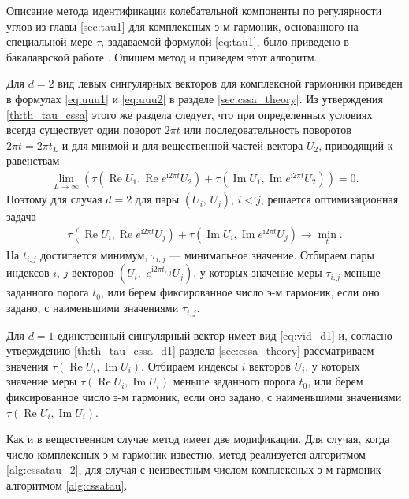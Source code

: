 \documentclass[specialist,
               substylefile = spbu.rtx,
               subf,href,colorlinks=true, 12pt]{disser}
\def\RE{\mathop{\mathrm{Re}}}
\def\IM{\mathop{\mathrm{Im}}}
\newcommand{\I}{\mathrm{i}}
\begin{document}
Описание метода идентификации колебательной компоненты по регулярности углов из главы \ref{sec:tau1} для комплексных э-м гармоник, основанного на специальной мере $\tau$, задаваемой формулой \eqref{eq:tau1}, было приведено в бакалаврской работе \cite{Zhornikova2016}. Опишем метод и приведем этот алгоритм.

Для $d=2$ вид левых сингулярных векторов для комплексной гармоники приведен в формулах \ref{eq:uuu1} и \eqref{eq:uuu2} в разделе \eqref{sec:cssa_theory}.
Из утверждения \ref{th:th_tau_cssa} этого же раздела следует, что при определенных условиях всегда существует один поворот $2\pi t$ или последовательность поворотов $2\pi t = 2\pi t_L$ и для мнимой и для вещественной частей вектора $U_2$, приводящий к равенствам
\begin{gather*}
\lim_{L \rightarrow \infty}(\tau (\RE U_1, \RE e^{\I 2\pi t} U_2) + \tau (\IM U_1, \IM e^{\I 2\pi t} U_2))= 0.
\end{gather*}
Поэтому для случая $d=2$ для пары $(U_i,\,U_j)$, $i<j$, решается оптимизационная задача
\begin{gather} \label{eq:cssa_tau_opt}
 \tau(\RE U_i, \RE e^{\I 2\pi t} U_j) + \tau(\IM U_i, \IM e^{\I 2\pi t} U_j) \longrightarrow \min_{t}.
\end{gather}
На $t_{i,j}$ достигается минимум, $\tau_{i,j}$ --- минимальное значение.
Отбираем пары индексов $i$, $j$ векторов $\left(U_i, \,\,e^{\mathrm{i} 2\pi t_{i,j}}U_j\right)$, у которых значение меры $\tau_{i,j}$
меньше заданного порога $t_0$, или берем фиксированное число э-м гармоник, если оно задано, с наименьшими значениями $\tau_{i,j}$.

Для $d=1$ единственный сингулярный вектор имеет вид \eqref{eq:vid_d1} и, согласно  утверждению \ref{th:th_tau_cssa_d1} раздела \ref{sec:cssa_theory} рассматриваем значения $\tau(\RE U_i, \IM U_i)$.
Отбираем индексы $i$ векторов $U_i$, у которых значение меры $\tau(\RE U_i, \IM U_i)$
меньше заданного порога $t_0$,
или берем фиксированное число э-м гармоник, если оно задано, с наименьшими значениями $\tau(\RE U_i, \IM U_i)$.

Как и в вещественном случае метод имеет две модификации. Для случая, когда число комплексных э-м гармоник известно, метод реализуется алгоритмом \ref{alg:cssatau_2}, для случая с неизвестным числом комплексных э-м гармоник --- алгоритмом \ref{alg:cssatau}. 
\end{document}
